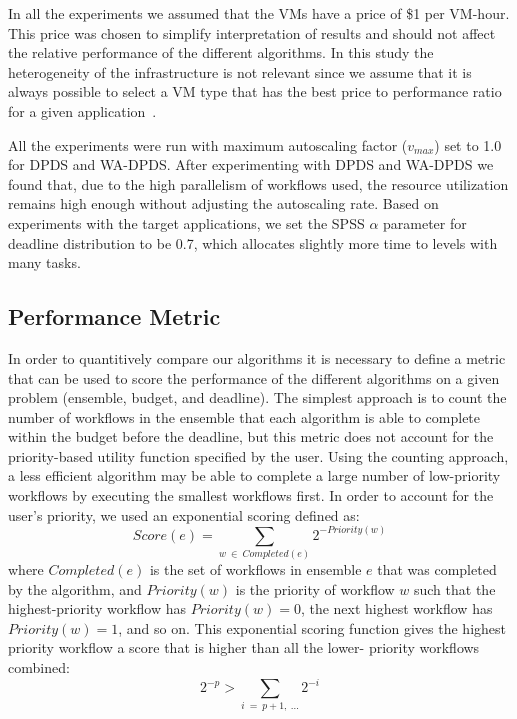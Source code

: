 \documentclass[conference]{IEEEtran}
\begin{document}
In all the experiments we assumed that the VMs have a price of \$1 per VM-hour.
This price was chosen to simplify interpretation of results and should not
affect the relative performance of the different algorithms. In this study the
heterogeneity of the infrastructure is not relevant since we assume that it is
always possible to select a VM type that has the best price to performance ratio
for a given application~\cite{Juve2009}.


All the experiments were run with maximum autoscaling factor ($v_{max}$) set to
1.0 for DPDS and WA-DPDS. After experimenting with DPDS and WA-DPDS we found
that, due to the high parallelism of workflows used, the resource utilization
remains high enough without adjusting the autoscaling rate. Based on experiments
with the target applications, we set the SPSS $\alpha$ parameter for deadline
distribution to be 0.7, which allocates slightly more time to levels with many
tasks.


\subsection{Performance Metric}
\label{sec:perf_metric}

In order to quantitively compare our algorithms it is necessary to define a
metric that can be used to score the performance of the different algorithms on
a given problem (ensemble, budget, and deadline). The simplest approach is to
count the number of workflows in the ensemble that each algorithm is able to
complete within the budget before the deadline, but this metric does not account
for the priority-based utility function specified by the user. Using the
counting approach, a less efficient algorithm may be able to complete a large
number of low-priority workflows by executing the smallest workflows first.
In order to account for the user's priority, we used an exponential scoring defined as:
%
$$
Score(e) = \sum_{w~\in~Completed(e)}{2^{-Priority(w)}}
$$
%
where $Completed(e)$ is the set of workflows in ensemble $e$ that was
completed by the algorithm, and $Priority(w)$ is the priority of workflow $w$
such that the highest-priority workflow has $Priority(w)=0$, the next highest
workflow has $Priority(w)=1$, and so on. This exponential scoring function
gives the highest priority workflow a score that is higher than all the lower-
priority workflows combined:
%
$$
2^{-p} > \sum_{i~=~p+1,~\ldots}2^{-i}
$$
%
\end{document}
